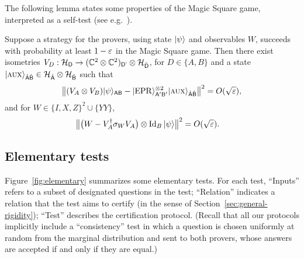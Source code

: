 The following lemma states some properties of the Magic Square game, interpreted as a self-test (see e.g.~\cite{WBMS16}). 

\begin{lemma}\label{lem:ms-rigid}
Suppose a strategy for the provers, using state $|\psi\rangle$ and observables $W$, succeeds with probability at least $1-\varepsilon$ in the Magic Square game. Then there exist  isometries $V_D:\mathcal{H}_{\textsf{D}} \to (\mathbb{C}^2\otimes \mathbb{C}^2)_{{\textsf{D'}}}\otimes {\mathcal{H}}_{\hat{{\textsf{D}}}}$, for $D\in\{A,B\}$ and a state $|\textsc {aux}\rangle_{\hat{{\textsf{A}}}\hat{{\textsf{B}}}} \in {\mathcal{H}}_{\hat{{\textsf{A}}}}\otimes {\mathcal{H}}_{\hat{{\textsf{B}}}}$ such that
$$\big\| (V_A \otimes V_B) |\psi\rangle_{{\textsf{AB}}} - |{\rm EPR}\rangle_{{\textsf{A}}'{\textsf{B}}'}^{\otimes 2} |\textsc {aux}\rangle_{\hat{{\textsf{A}}}\hat{{\textsf{B}}}} \big\|^2 = O(\sqrt{\varepsilon}),$$
and for $W\in \{I,X,Z\}^2 \cup \{YY\}$,
\begin{align*}
\big\| \big(W -V_A^\dagger \sigma_W V_A\big) \otimes \mathop{\rm Id}\nolimits_B |\psi\rangle \big\|^2 &= O(\sqrt{\varepsilon}).
\end{align*}
\end{lemma}





\subsection{Elementary tests}
\label{sec:elementary}


Figure~\ref{fig:elementary} summarizes some elementary tests. For each test, ``Inputs'' refers to a subset of designated questions in the test; ``Relation'' indicates a relation that the test aims to certify (in the sense of Section~\ref{sec:general-rigidity}); ``Test'' describes the certification protocol. (Recall that all our protocols implicitly include a ``consistency'' test in which a question is chosen uniformly at random from the marginal distribution and sent to both provers, whose answers are accepted if and only if they are equal.)

